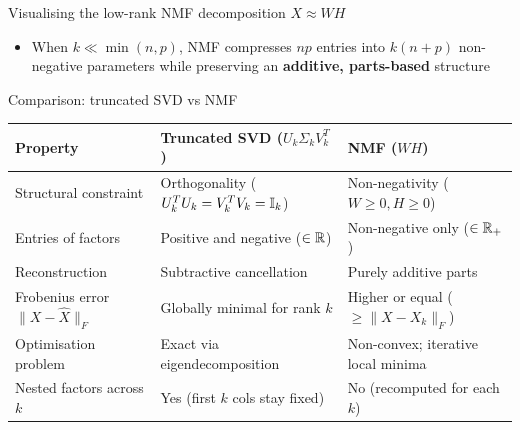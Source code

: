 \documentclass[aspectratio=169]{beamer}\usepackage[]{graphicx}\usepackage[]{xcolor}
\begin{document}
\begin{frame}{Visualising the low-rank NMF decomposition $X \approx W H$}
\begin{center}
\end{center}
\vfill
\begin{itemize}
\item When $k \ll \min(n, p)$, NMF compresses $np$ entries into $k(n + p)$ non-negative parameters while preserving an \textbf{additive, parts-based} structure
\end{itemize}
\end{frame}


\begin{frame}{Comparison: truncated SVD vs NMF}
\begin{center}
\begin{tabular}{lll}
\toprule
\textbf{Property} & \textbf{Truncated SVD ($U_k \Sigma_k V_k^T$)} & \textbf{NMF ($W H$)} \\
\midrule
Structural constraint & Orthogonality ($U_k^T U_k = V_k^T V_k = \mathbb{I}_k$) & Non-negativity ($W \ge 0, H \ge 0$) \\
Entries of factors & Positive and negative ($\in \mathbb{R}$) & Non-negative only ($\in \mathbb{R}_+$) \\
Reconstruction & Subtractive cancellation & Purely additive parts \\
Frobenius error $\|X - \hat{X}\|_F$ & Globally minimal for rank $k$ & Higher or equal ($\ge \|X - X_k\|_F$) \\
Optimisation problem & Exact via eigendecomposition & Non-convex; iterative local minima \\
Nested factors across $k$ & Yes (first $k$ cols stay fixed) & No (recomputed for each $k$) \\
\bottomrule
\end{tabular}
\end{center}
\end{frame}
\end{document}
